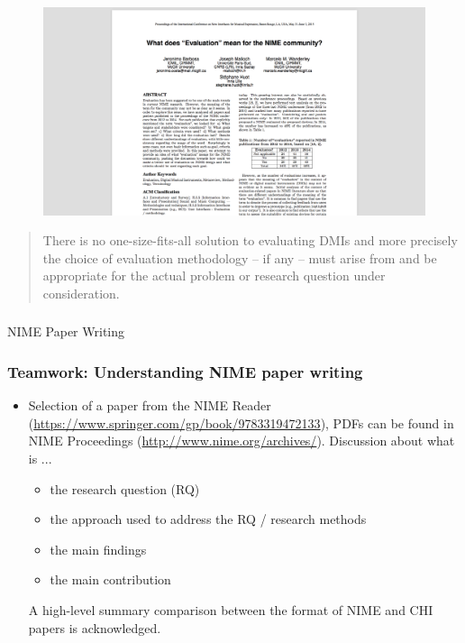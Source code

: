\documentclass[screen, aspectratio=169]{beamer}
\begin{document}
%
\begin{frame}
\frametitle{}
 \begin{figure}
	\includegraphics[scale=0.25]{img/Barbosa-et-al-2015.png}
    \end{figure}	
\begin{quote}There is no one-size-fits-all solution to evaluating DMIs and more precisely the choice of evaluation methodology -- if any -- must arise from and be appropriate for the actual problem or research question under consideration. \cite[p.161]{Barbosa.et.al.2015.evaluationNIME}
\end{quote}
\end{frame}
%
\begin{frame}
\frametitle{}
\Huge{NIME Paper Writing}
\end{frame}
%
\begin{frame}
\frametitle{Teamwork: Understanding NIME paper writing}
\begin{itemize}
\item Selection of a paper from the NIME Reader (\url{https://www.springer.com/gp/book/9783319472133}), PDFs can be found in NIME Proceedings (\url{http://www.nime.org/archives/}).
Discussion about what is ... 
\begin{itemize}
\item the research question (RQ)
\item the approach used to address the RQ / research methods
\item the main findings 
\item the main contribution
\end{itemize}
A high-level summary comparison between the format of NIME and CHI papers is acknowledged.
\end{itemize}
\end{frame}
%
\end{document}
